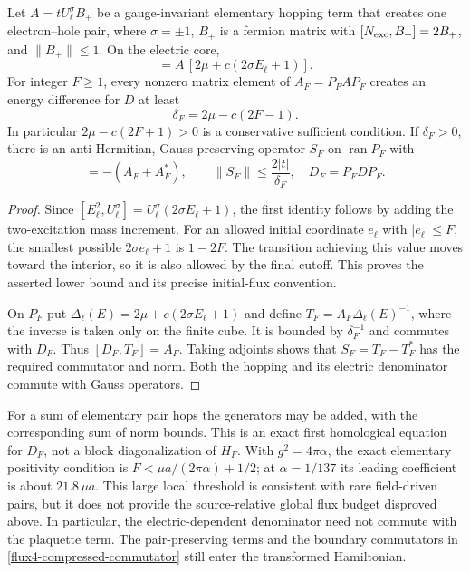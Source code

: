\begin{lemma}
\label{flux4-pair-denominator}
Let $A=tU_\ell^\sigma B_+$ be a gauge-invariant elementary hopping
term that creates one electron--hole pair, where $\sigma=\pm1$,
$B_+$ is a fermion matrix with $[N_{\rm exc},B_+]=2B_+$, and
$\|B_+\|\le1$.  On the electric core,
\begin{equation}
 [D,A]=A\,[2\mu+c(2\sigma E_\ell+1)].
 \label{flux4-exact-denominator}
\end{equation}
For integer $F\ge1$, every nonzero matrix element of
$A_F=P_FAP_F$ creates an energy difference for $D$ at least
\begin{equation}
 \delta_F=2\mu-c(2F-1).
 \label{flux4-internal-denominator}
\end{equation}
In particular $2\mu-c(2F+1)>0$ is a conservative sufficient
condition.  If $\delta_F>0$, there is an anti-Hermitian,
Gauss-preserving operator $S_F$ on $\operatorname{ran}P_F$ with
\begin{equation}
 [S_F,D_F]=-(A_F+A_F^*),\qquad
 \|S_F\|\le\frac{2|t|}{\delta_F},
 \quad D_F=P_FDP_F.
 \label{flux4-first-generator}
\end{equation}
\end{lemma}
\begin{proof}
Since $[E_\ell^2,U_\ell^\sigma]
=U_\ell^\sigma(2\sigma E_\ell+1)$, the first identity follows
by adding the two-excitation mass increment.  For an allowed initial
coordinate $e_\ell$ with $|e_\ell|\le F$, the smallest possible
$2\sigma e_\ell+1$ is $1-2F$.  The transition achieving this
value moves toward the interior, so it is also allowed by the final
cutoff.  This proves the asserted lower bound and its precise
initial-flux convention.

On $P_F$ put
$\Delta_\ell(E)=2\mu+c(2\sigma E_\ell+1)$ and define
$T_F=A_F\Delta_\ell(E)^{-1}$, where the inverse is taken only on
the finite cube.  It is bounded by $\delta_F^{-1}$ and commutes
with $D_F$.  Thus $[D_F,T_F]=A_F$.  Taking adjoints shows that
$S_F=T_F-T_F^*$ has the required commutator and norm.  Both the
hopping and its electric denominator commute with Gauss operators.
\end{proof}

For a sum of elementary pair hops the generators may be added, with
the corresponding sum of norm bounds.  This is an exact first
homological equation for $D_F$, not a block diagonalization of $H_F$.
With $g^2=4\pi\alpha$, the exact elementary positivity condition is
$F<\mu a/(2\pi\alpha)+1/2$; at $\alpha=1/137$ its leading
coefficient is about $21.8\,\mu a$. This large local threshold is
consistent with rare field-driven pairs, but it does not provide the
source-relative global flux budget disproved above.
In particular, the electric-dependent denominator need not commute
with the plaquette term.  The pair-preserving terms and the boundary
commutators in \eqref{flux4-compressed-commutator} still enter the
transformed Hamiltonian.


